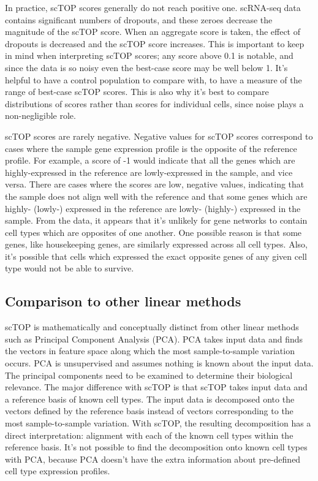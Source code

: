 \documentclass[aps,superscriptaddress, notitlepage,longbibliography]{revtex4-1}
\begin{document}
In practice, scTOP scores generally do not reach positive one. scRNA-seq data contains significant numbers of dropouts, and these zeroes decrease the magnitude of the scTOP score. When an aggregate score is taken, the effect of dropouts is decreased and the scTOP score increases. This is important to keep in mind when interpreting scTOP scores; any score above 0.1 is notable, and since the data is so noisy even the best-case score may be well below 1. It's helpful to have a control population to compare with, to have a measure of the range of best-case scTOP scores. This is also why it's best to compare distributions of scores rather than scores for individual cells, since noise plays a non-negligible role.

scTOP scores are rarely negative. Negative values for scTOP scores correspond to cases where the sample gene expression profile is the opposite of the reference profile. For example, a score of -1 would indicate that all the genes which are highly-expressed in the reference are lowly-expressed in the sample, and vice versa. There are cases where the scores are low, negative values, indicating that the sample does not align well with the reference and that some genes which are highly- (lowly-) expressed in the reference are lowly- (highly-) expressed in the sample. From the data, it appears that it’s unlikely for gene networks to contain cell types which are opposites of one another. One possible reason is that some genes, like housekeeping genes, are similarly expressed across all cell types. Also, it’s possible that cells which expressed the exact opposite genes of any given cell type would not be able to survive.


\subsection{Comparison to other linear methods}
scTOP is mathematically and conceptually distinct from other linear methods such as Principal Component Analysis (PCA). PCA takes input data and finds the vectors in feature space along which the most sample-to-sample variation occurs. PCA is unsupervised and assumes nothing is known about the input data. The principal components need to be examined to determine their biological relevance. The major difference with scTOP is that scTOP takes input data and a reference basis of known cell types. The input data is decomposed onto the vectors defined by the reference basis instead of vectors corresponding to the most sample-to-sample variation. With scTOP, the resulting decomposition has a direct interpretation: alignment with each of the known cell types within the reference basis. It’s not possible to find the decomposition onto known cell types with PCA, because PCA doesn’t have the extra information about pre-defined cell type expression profiles. 
\end{document}
